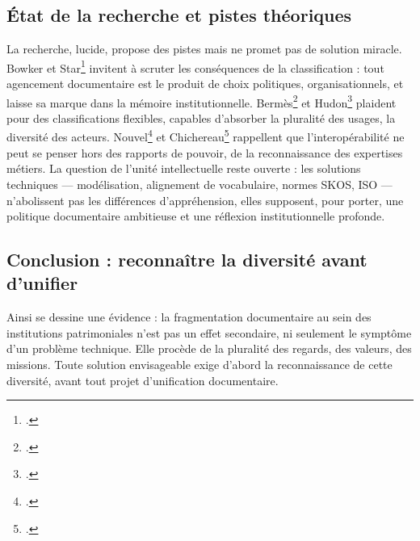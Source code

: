 \subsection{État de la recherche et pistes théoriques}

La recherche, lucide, propose des pistes mais ne promet pas de solution miracle. Bowker et Star\footcite{bowkerArrangerChosesConsequences2023} invitent à scruter les conséquences de la classification : tout agencement documentaire est le produit de choix politiques, organisationnels, et laisse sa marque dans la mémoire institutionnelle. Bermès\footcite{bermesVersNouveauxCatalogues2016} et Hudon\footcite{hudonISO25964Pour2012a} plaident pour des classifications flexibles, capables d’absorber la pluralité des usages, la diversité des acteurs. Nouvel\footcite{nouvelOutilsDindexationBibliothecaires2022} et Chichereau\footcite{chichereauNormesConceptionGestion2007} rappellent que l’interopérabilité ne peut se penser hors des rapports de pouvoir, de la reconnaissance des expertises métiers. La question de l’unité intellectuelle reste ouverte : les solutions techniques — modélisation, alignement de vocabulaire, normes SKOS, ISO — n’abolissent pas les différences d’appréhension, elles supposent, pour porter, une politique documentaire ambitieuse et une réflexion institutionnelle profonde.

\subsection{Conclusion : reconnaître la diversité avant d'unifier}

Ainsi se dessine une évidence : la fragmentation documentaire au sein des institutions patrimoniales n’est pas un effet secondaire, ni seulement le symptôme d’un problème technique. Elle procède de la pluralité des regards, des valeurs, des missions. Toute solution envisageable exige d’abord la reconnaissance de cette diversité, avant tout projet d’unification documentaire.